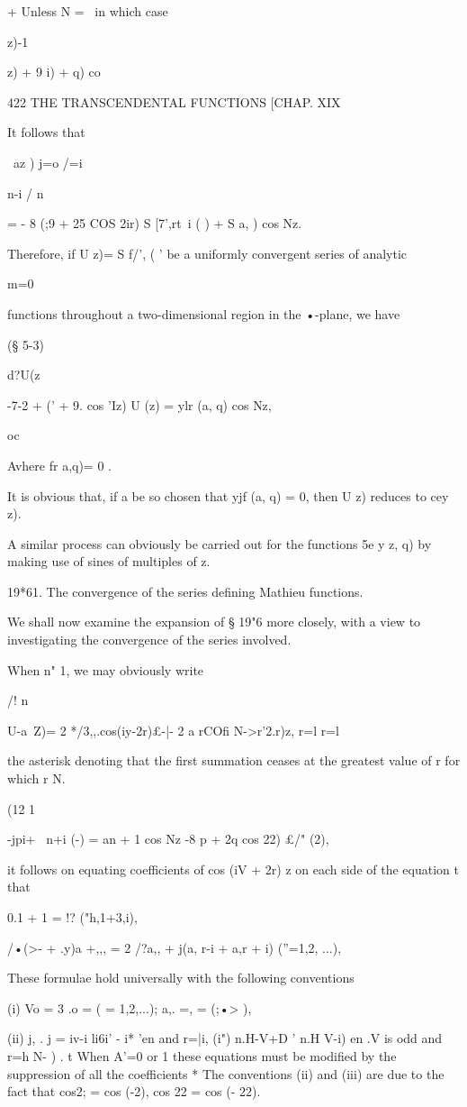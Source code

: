 + Unless N = \, in which case \ \ \ \ {z)-1\ \ {z) + 9 i) + q) co%

422 THE TRANSCENDENTAL FUNCTIONS [CHAP. XIX

It follows that

\ az ) j=o /=i

n-i / n \

= - 8 (;9 + 25 COS 2ir) S [7',rt\ i ( ) + S a, ) cos Nz.

Therefore, if U z)= S f/', ( ' be a uniformly convergent series of
analytic

m=0

functions throughout a two-dimensional region in the •-plane, we have

(§ 5-3)

d?U(z

-7-2 + (' + 9. cos 'Iz) U (z) = ylr (a, q) cos Nz,

oc

Avhere fr a,q)= 0 .

It is obvious that, if a be so chosen that yjf (a, q) = 0, then U z)
reduces to cey z).

A similar process can obviously be carried out for the functions 5e y
z, q) by making use of sines of multiples of z.

19*61. The convergence of the series defining Mathieu functions.

We shall now examine the expansion of § 19"6 more closely, with a view
to investigating the convergence of the series involved.

When n" 1, we may obviously write

/! n

U-a\ Z)= 2 */3,,.cos(iy-2r)£-|- 2 a rCOfi N->r'2.r)z, r=l r=l

the asterisk denoting that the first summation ceases at the greatest
value of r for which r N.

 (12 1

-jpi+ \ n+i (-) = an + 1 cos Nz -8 p + 2q cos 22) £/" (2),

it follows on equating coefficients of cos (iV + 2r) z on each side of
the equation t that

0.1 + 1 = !? ("h,1+3,i),

/•(>- + .y)a +,,, = 2 /?a,, + j(a, r-i + a,r + i) (''=1,2, ...),

These formulae hold universally with the following conventions %

(i) Vo = 3 .o = ( = 1,2,...); a,. =, = (;•> ),

(ii) j, . j = iv-i li6i' - i* 'en and r=|i, (i") n.H-V+D ' n.H V-i)
en .V is odd and r=h N- ) . t When A'=0 or 1 these equations must be
modified by the suppression of all the coefficients * The conventions
(ii) and (iii) are due to the fact that cos2; = cos (-2), cos 22 = cos
(- 22).

}}
